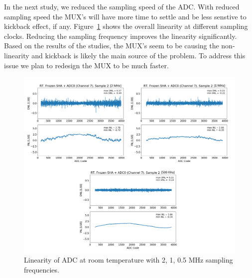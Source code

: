 In the next study, we reduced the sampling speed of the ADC. With reduced sampling speed the MUX's will have more time to settle and be less senstive to kickback effect, if any. Figure~\ref{fig:linearity_mux_speed} shows the overall linearity at different sampling clocks. Reducing the sampling frequency improves the linearity significantly. Based on the results of the studies, the MUX's seem to be causing the non-linearity and kickback is likely the main source of the problem. To address this issue we plan to redesign the MUX to be much faster.
\begin{figure}[h!]
\centering
  \includegraphics[width=1.0\linewidth]{figures/prakash_fig/linearity_mux_speed.png}
  \caption{Linearity of ADC at room temperature with 2, 1, 0.5 MHz sampling frequencies.}
  \label{fig:linearity_mux_speed}
\end{figure}


